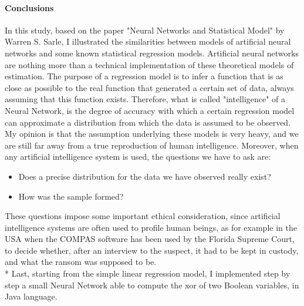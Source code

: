 \documentclass[10pt,a4paper]{article}
\begin{document}
\paragraph{Conclusions}
In this study, based on the paper "Neural Networks and Statistical Model" by Warren S. Sarle, I illustrated the similarities between models of artificial neural networks and some known statistical regression models. Artificial neural networks are nothing more than a technical implementation of these theoretical models of estimation. The purpose of a regression model is to infer a function that is as close as possible to the real function that generated a certain set of data, always assuming that this function exists. Therefore, what is called "intelligence" of a Neural Network, is the degree of accuracy with which a certain regression model can approximate a distribution from which the data is assumed to be observed. My opinion is that the assumption underlying these models is very heavy, and we are still far away from a true reproduction of human intelligence. Moreover, when any artificial intelligence system is used, the questions we have to ask are:
\begin{itemize}
	\item Does a precise distribution for the data we have observed really exist?
	\item How was the sample formed?
\end{itemize}
These questions impose some important ethical consideration, since artificial intelligence systems are often used to profile human beings, as for example in the USA when the COMPAS software has been used by the Florida Supreme Court, to decide whether, after an interview to the suspect, it had to be kept in custody, and what the ransom was supposed to be.\\* Last, starting from the simple linear regression model, I implemented step by step a small Neural Network able to compute the xor of two Boolean variables, in Java language.
\end{document}
